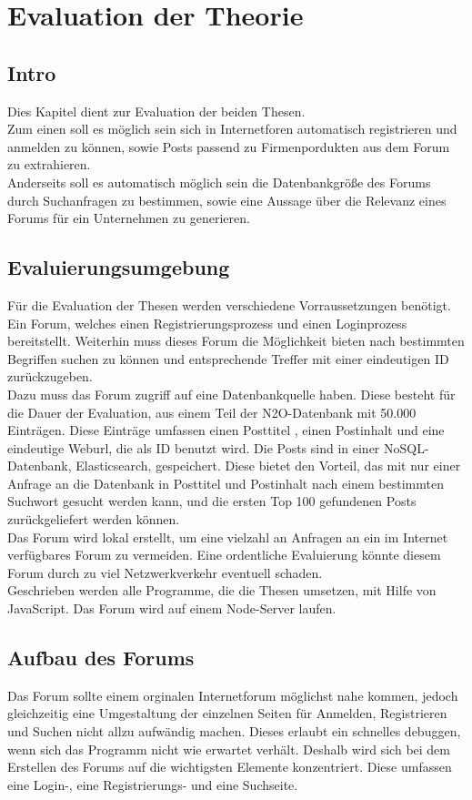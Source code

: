 \section{Evaluation der Theorie}
\subsection{Intro}
Dies Kapitel dient zur Evaluation der beiden Thesen.\\
Zum einen soll es möglich sein sich in Internetforen automatisch registrieren und anmelden zu können, sowie Posts passend zu Firmenpordukten aus dem Forum zu extrahieren.\\
Anderseits soll es automatisch möglich sein die Datenbankgröße des Forums durch Suchanfragen zu bestimmen, sowie eine Aussage über die Relevanz eines Forums für ein Unternehmen zu generieren.
\subsection{Evaluierungsumgebung}
Für die Evaluation der Thesen werden verschiedene Vorraussetzungen benötigt. Ein Forum, welches einen Registrierungsprozess und einen Loginprozess bereitstellt. Weiterhin muss dieses Forum die Möglichkeit bieten nach bestimmten Begriffen suchen zu können und entsprechende Treffer mit einer eindeutigen ID zurückzugeben.\\
Dazu muss das Forum zugriff auf eine Datenbankquelle haben. Diese besteht für die Dauer der Evaluation, aus einem Teil der N2O-Datenbank mit 50.000 Einträgen. Diese Einträge umfassen einen Posttitel , einen Postinhalt und eine eindeutige Weburl, die als ID benutzt wird. Die Posts sind in einer NoSQL-Datenbank, Elasticsearch, gespeichert. Diese bietet den Vorteil, das mit nur einer Anfrage an die Datenbank in Posttitel und Postinhalt nach einem bestimmten Suchwort gesucht werden kann, und die ersten Top 100 gefundenen Posts zurückgeliefert werden können.\\
Das Forum wird lokal erstellt, um eine vielzahl an Anfragen an ein im Internet verfügbares Forum zu vermeiden. Eine ordentliche Evaluierung könnte diesem Forum durch zu viel Netzwerkverkehr eventuell schaden.\\
Geschrieben werden alle Programme, die die Thesen umsetzen, mit Hilfe von JavaScript. Das Forum wird auf einem Node-Server laufen. 
\subsection{Aufbau des Forums}
Das Forum sollte einem orginalen Internetforum möglichst nahe kommen, jedoch gleichzeitig eine Umgestaltung der einzelnen Seiten für Anmelden, Registrieren und Suchen nicht allzu aufwändig machen. Dieses erlaubt ein schnelles debuggen, wenn sich das Programm nicht wie erwartet verhält. Deshalb wird sich bei dem Erstellen des Forums auf die wichtigsten Elemente konzentriert. Diese umfassen eine Login-, eine Registrierungs- und eine Suchseite.
